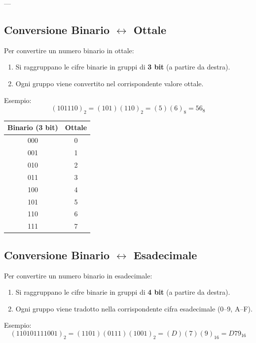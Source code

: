 \documentclass[a4paper,12pt]{report}
\renewcommand{\arraystretch}{1.2} %
\begin{document}
---

\subsection*{Conversione Binario $\leftrightarrow$ Ottale}

Per convertire un numero binario in ottale:
\begin{enumerate}
    \item Si raggruppano le cifre binarie in gruppi di \textbf{3 bit} (a partire da destra).
    \item Ogni gruppo viene convertito nel corrispondente valore ottale.
\end{enumerate}

Esempio:
\[
(101110)_2 = (101)(110)_2 = (5)(6)_8 = \boxed{56_8}
\]

\begin{center}
\renewcommand{\arraystretch}{1.2}
\setlength{\tabcolsep}{10pt}
\begin{tabular}{|c|c|}
\hline
\textbf{Binario (3 bit)} & \textbf{Ottale} \\
\hline
000 & 0 \\
001 & 1 \\
010 & 2 \\
011 & 3 \\
100 & 4 \\
101 & 5 \\
110 & 6 \\
111 & 7 \\
\hline
\end{tabular}
\end{center}


\subsection*{Conversione Binario $\leftrightarrow$ Esadecimale}

Per convertire un numero binario in esadecimale:
\begin{enumerate}
    \item Si raggruppano le cifre binarie in gruppi di \textbf{4 bit} (a partire da destra).
    \item Ogni gruppo viene tradotto nella corrispondente cifra esadecimale (0–9, A–F).
\end{enumerate}

Esempio:
\[
(110101111001)_2 = (1101)(0111)(1001)_2 = (D)(7)(9)_{16} = \boxed{D79_{16}}
\]
\end{document}
